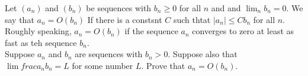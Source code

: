 \documentclass[12pt]{article}
\makeatletter
\theoremstyle{homework}
\newenvironment{exercise}[1]
{\def\@currentlabel{#1}\exercisecore}
{\endexercisecore}
\makeatother
\begin{document}
\begin{exercise}{9} Let $(a_n)$ and $(b_n)$ be sequences with $b_n \geq 0$
  for all $n$ and and $\lim_nb_n = 0$. We say that 
  $a_n = O(b_n)$ If there is a constsnt $C$ such thtat $|a_n|\le Cb_n$ for all $n$. Roughly
  speaking, $a_n = O(b_n)$ if the sequence $a_n$ converges to zero at least as fast as teh sequence $b_n$.\\
  Suppose $a_n$ and $b_n$ are sequences with $b_n > 0$. Suppose also that $\lim frac{a_n}{b_n} = L$ for some number $L$.
  Prove that $a_n = O(b_n)$. 







\end{exercise}
\end{document}
